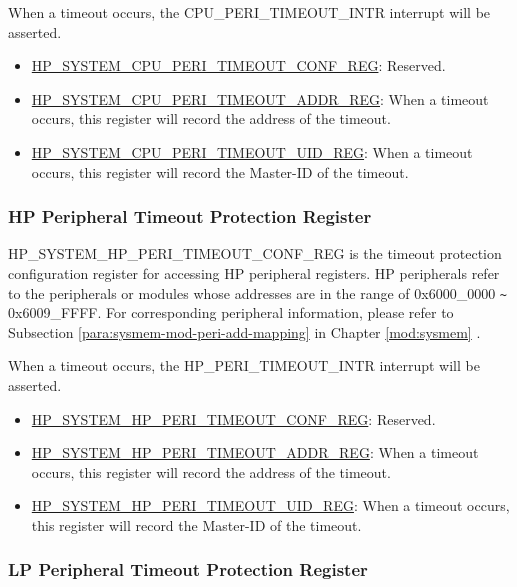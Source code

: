 \documentclass[main\_\_EN.tex]{subfiles}
\begin{document}
When a timeout occurs, the CPU\_PERI\_TIMEOUT\_INTR interrupt will be asserted.

\begin{itemize}
    \item \hyperref[regdesc:HPSYSTEMCPUPERITIMEOUTCONFREG]{HP\_SYSTEM\_CPU\_PERI\_TIMEOUT\_CONF\_REG}: Reserved.
    \item \hyperref[regdesc:HPSYSTEMCPUPERITIMEOUTADDRREG]{HP\_SYSTEM\_CPU\_PERI\_TIMEOUT\_ADDR\_REG}: 
    When a timeout occurs, this register will record the address of the timeout.
    \item \hyperref[regdesc:HPSYSTEMCPUPERITIMEOUTUIDREG]{HP\_SYSTEM\_CPU\_PERI\_TIMEOUT\_UID\_REG}: 
    When a timeout occurs, this register will record the Master-ID of the timeout.
\end{itemize}


\subsubsection{HP Peripheral Timeout Protection Register}

HP\_SYSTEM\_HP\_PERI\_TIMEOUT\_CONF\_REG is the timeout protection configuration register for accessing HP peripheral registers.
HP peripherals refer to the peripherals or modules whose addresses are in the range of 0x6000\_0000 \verb+~+ 0x6009\_FFFF. For corresponding peripheral information, please refer to Subsection \ref{para:sysmem-mod-peri-add-mapping} \textit{} in Chapter \ref{mod:sysmem} \textit{}.

When a timeout occurs, the HP\_PERI\_TIMEOUT\_INTR interrupt will be asserted.

\begin{itemize}
    \item \hyperref[regdesc:HPSYSTEMHPPERITIMEOUTCONFREG]{HP\_SYSTEM\_HP\_PERI\_TIMEOUT\_CONF\_REG}: Reserved.
    \item \hyperref[regdesc:HPSYSTEMHPPERITIMEOUTADDRREG]{HP\_SYSTEM\_HP\_PERI\_TIMEOUT\_ADDR\_REG}: 
    When a timeout occurs, this register will record the address of the timeout.
    \item \hyperref[regdesc:HPSYSTEMHPPERITIMEOUTUIDREG]{HP\_SYSTEM\_HP\_PERI\_TIMEOUT\_UID\_REG}: 
    When a timeout occurs, this register will record the Master-ID of the timeout.
\end{itemize}

\subsubsection{LP Peripheral Timeout Protection Register}
\end{document}
